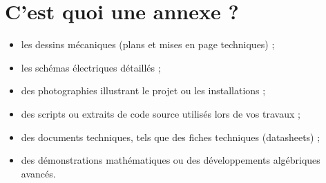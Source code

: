 \chapter{C'est quoi une annexe ?}


\begin{itemize}
    \item les dessins mécaniques (plans et mises en page techniques) ;
    \item les schémas électriques détaillés ;
    \item des photographies illustrant le projet ou les installations ;
    \item des scripts ou extraits de code source utilisés lors de vos travaux ;
    \item des documents techniques, tels que des fiches techniques (datasheets) ;
    \item des démonstrations mathématiques ou des développements algébriques avancés.
\end{itemize}


